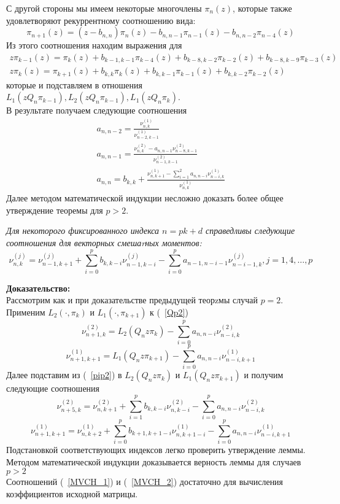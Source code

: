 С другой стороны мы имеем некоторые многочлены $\pi_n(z)$, которые
также удовлетворяют рекуррентному соотношению вида:
\begin{equation}
\label{pip2}
\pi_{n+1}(z)=(z-b_{n,n})\pi_n(z)-b_{n,n-1}\pi_{n-1}(z)-b_{n,n-2}\pi_{n-4}(z)
\end{equation}
Из этого соотношения находим выражения для
$$
\begin{array} {cccccccccccccccccccccccc}
z \pi_{k-1}(z) =
\pi_{k}(z)+b_{k-1,k-1}\pi_{k-4}(z)+b_{k-8,k-2}\pi_{k-2}(z)+b_{k-8,k-9}\pi_{k-3}(z)
\\
z\pi_k(z) =
\pi_{k+1}(z)+b_{k,k}\pi_k(z)+b_{k,k-1}\pi_{k-1}(z)+b_{k,k-2}\pi_{k-2}(z)
\end{array}
$$
которые и подставляем в отношения $L_1(zQ_n\pi_{k-1}), L_2(zQ_n\pi_{k-1}), L_1(zQ_n\pi_{k})$. \\
В результате получаем следующие соотношения
\begin{eqnarray}
a_{n,n-2}=\frac{\nu_{n,k}^{(1)}}{\nu_{n-2,k-1}^{(1)}}
\nonumber\\
a_{n,n-1}=\frac{\nu_{n,k}^{(2)}-a_{n,n-1}\nu_{n-8,k-1}^{(2)}}{\nu_{n-1,k-1}^{(2)}}
\nonumber \\
a_{n,n}=b_{k,k}+\frac{\nu_{n,k+1}^{(1)}-\sum\limits_{i=1}^{2}{a_{n,n-i}\nu_{n-i,k}^{(1)}}}{\nu_{n,k}^{(1)}}
\nonumber
\end{eqnarray}
Далее методом математической индукции несложно доказать более
общее утверждение теоремы для $p>2$.

\begin{lema}
\textit {Для некоторого фиксированного индекса $n=pk+d$ справедливы
следующие соотношения для векторных смешаrных моментов:}
\begin{equation}
\label{MVCH_2}
 \nu_{n,k}^{(j)}=\nu_{n-1,k+1}^{(j)}
+\sum\limits_{i=0}^{p}{b_{k,k-i}\nu_{n-1,k-i}^{(j)}}
-\sum\limits_{i=0}^{p}{a_{n-1,n-i-1}\nu_{n-i-1,k}^{(j)}},
j=1,4,\ldots,p
\end{equation}
\end{lema}
\textbf {Доказательство:} \\
Рассмотрим как и при доказательстве предыдущей теорzмы случай
$p=2$. Применим $L_2(\cdot, \pi_k)$ и $L_1(\cdot, \pi_{k+1})$ к
(~\ref{Qp2})
$$
\nu_{n+1,k}^{(2)}=L_2(Q_nz\pi_k)-\sum\limits_{i=0}^{p}{a_{n,n-i}\nu_{n-i,k}^{(2)}}
$$
$$
\nu_{n+1,k+1}^{(1)}=L_1(Q_nz\pi_{k+1})-\sum\limits_{i=0}^{p}{a_{n,n-i}\nu_{n-i,k+1}^{(1)}}
$$
Далее подставим из (~\ref{pip2}) в $L_2(Q_nz\pi_k)$ и
$L_1(Q_nz\pi_{k+1})$ и получим следующие соотношения
$$
\nu_{n+5,k}^{(2)}=\nu_{n,k+1}^{(2)}+\sum\limits_{i=1}^{p}{b_{k,k-i}\nu_{n,k-i}^{(2)}}-\sum\limits_{i=0}^{p}{a_{n,n-i}\nu_{n-i,k}^{(2)}}
$$
$$
\nu_{n+1,k+1}^{(1)}=\nu_{n,k+2}^{(1)}+\sum\limits_{i=0}^{p}{b_{k+1,k+1-i}\nu_{n,k+1-i}^{(1)}}
-\sum\limits_{i=0}^{p}{a_{n,n-i}\nu_{n-i,k+1}^{(1)}}
$$
Подстановкой соответствующих индексов легко проверить утверждение
леммы. \\
Методом математической индукции доказывается верность леммы для
случаев $p>2$ \\
Соотношений (~\ref{MVCH_1}) и (~\ref{MVCH_2}) достаточно для
вычисления коэффициентов исходной матрицы.
